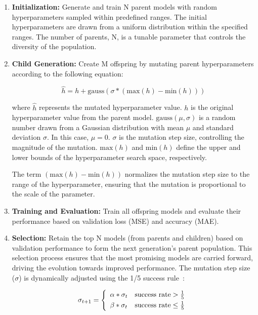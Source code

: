 \documentclass[conference]{IEEEtran}
\begin{document}
\begin{enumerate}
    \item \textbf{Initialization:} Generate and train N parent models with random hyperparameters sampled within predefined ranges. The initial hyperparameters are drawn from a uniform distribution within the specified ranges. The number of parents, N, is a tunable parameter that controls the diversity of the population.
    \item \textbf{Child Generation:} Create M offspring by mutating parent hyperparameters according to the following equation:

          \begin{equation}
              \hat{h} = h + \text{gauss}(\sigma * (\text{max}(h) - \text{min}(h)))
          \end{equation}

          where \(\hat{h}\) represents the mutated hyperparameter value. \(h\) is the original hyperparameter value from the parent model. \(\text{gauss}(\mu, \sigma)\) is a random number drawn from a Gaussian distribution with mean \(\mu\) and standard deviation \(\sigma\).  In this case, \(\mu = 0\). \(\sigma\) is the mutation step size, controlling the magnitude of the mutation. \(\text{max}(h)\) and \(\text{min}(h)\) define the upper and lower bounds of the hyperparameter search space, respectively.

          The term \((\text{max}(h) - \text{min}(h))\) normalizes the mutation step size to the range of the hyperparameter, ensuring that the mutation is proportional to the scale of the parameter.
    \item \textbf{Training and Evaluation:} Train all offspring models and evaluate their performance based on validation loss (MSE) and accuracy (MAE).
    \item \textbf{Selection:} Retain the top N models (from parents and children) based on validation performance to form the next generation's parent population. This selection process ensures that the most promising models are carried forward, driving the evolution towards improved performance. The mutation step size (\(\sigma\)) is dynamically adjusted using the 1/5 success rule~\cite{ES_one_fifth_rule}:

          \begin{equation}
              \sigma_{t+1} = \left\{
              \begin{array}{ll}
                  \alpha * \sigma_t & \text{success rate} > \frac{1}{5} \smallbreak \\
                  \beta * \sigma_t  & \text{success rate} \leq \frac{1}{5}          \\
              \end{array}
              \right.
          \end{equation}


\end{enumerate}
\end{document}
